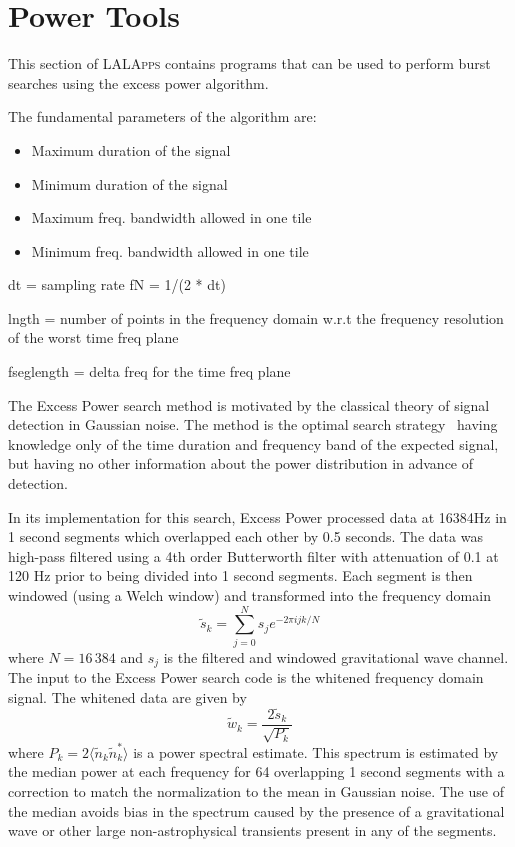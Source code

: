 
\clearpage

\section{Power Tools}
\label{section:powertools}

This section of \textsc{LALApps} contains programs that can be used to
perform burst searches using the excess power algorithm.   

The fundamental parameters of the algorithm are:
\begin{itemize}
\item Maximum duration of the signal
\item Minimum duration of the signal
\item Maximum freq. bandwidth allowed in one tile
\item Minimum freq. bandwidth allowed in one tile
\end{itemize}


dt = sampling rate
fN = 1/(2 * dt)

lngth = number of points in the frequency domain w.r.t the frequency
resolution of the worst time freq plane



fseglength = delta freq for the time freq plane


The Excess Power search method is motivated by the classical theory of
signal detection in Gaussian noise.  The method is the optimal search
strategy~\cite{ref:power} having knowledge only of the time duration
and frequency band of the expected signal,  but having no other
information about the power distribution in advance of detection. 

In its implementation for this search, Excess Power processed data at
16384Hz in 1 second segments which overlapped each other by 0.5
seconds.   The data was high-pass filtered using a 4th order
Butterworth filter with attenuation of 0.1 at 120 Hz prior to being
divided into 1 second segments.  Each segment is then windowed (using
a Welch window) and transformed into the frequency domain 
\begin{equation}
\tilde{s}_k =  \sum_{j=0}^{N} s_j e^{-2 \pi i j k /N}
\end{equation}
where $N=16\, 384$ and $s_j$ is the filtered and windowed gravitational 
wave channel.  The input to the Excess Power search code is the whitened 
frequency domain signal.  The whitened data are given by
\begin{equation}
\tilde{w}_k = \frac{ 2 \tilde{s}_k } {\sqrt{ P_k }}
\end{equation}
where $P_k = 2 \langle \tilde{n}_k \tilde{n}_k^\ast \rangle$ is a
power spectral estimate.  This spectrum is estimated by the median
power at each frequency for 64 overlapping 1 second segments with a
correction to match the normalization to the mean in Gaussian noise.
The use of the median avoids bias in the spectrum caused by the
presence of a gravitational wave or other large non-astrophysical
transients present in any of the segments.   

